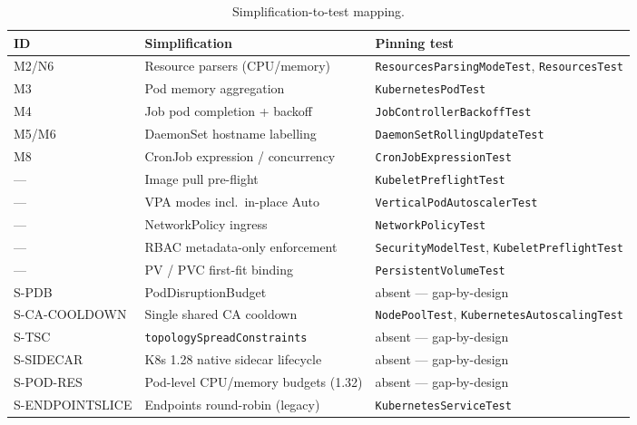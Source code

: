 \documentclass[ASNA,twocolumn]{USG}
\begin{document}
    \begin{table}[!t]
        \centering
        \caption{Simplification-to-test mapping.\label{tab:simpl-tests}}
        \footnotesize
        \setlength{\tabcolsep}{6pt}
        \begin{tabular*}{\textwidth}{@{\extracolsep{\fill}}lll@{}}
\toprule
\textbf{ID} & \textbf{Simplification} & \textbf{Pinning test} \\
\midrule
M2/N6           & Resource parsers (CPU/memory)         & \texttt{ResourcesParsingModeTest}, \texttt{ResourcesTest} \\
M3              & Pod memory aggregation                & \texttt{KubernetesPodTest} \\
M4              & Job pod completion + backoff          & \texttt{JobControllerBackoffTest} \\
M5/M6           & DaemonSet hostname labelling          & \texttt{DaemonSetRollingUpdateTest} \\
M8              & CronJob expression / concurrency      & \texttt{CronJobExpressionTest} \\
---             & Image pull pre-flight                 & \texttt{KubeletPreflightTest} \\
---             & VPA modes incl.\ in-place Auto        & \texttt{VerticalPodAutoscalerTest} \\
---             & NetworkPolicy ingress                 & \texttt{NetworkPolicyTest} \\
---             & RBAC metadata-only enforcement        & \texttt{SecurityModelTest}, \texttt{KubeletPreflightTest} \\
---             & PV / PVC first-fit binding            & \texttt{PersistentVolumeTest} \\
S-PDB           & PodDisruptionBudget                   & absent --- gap-by-design \\
S-CA-COOLDOWN   & Single shared CA cooldown             & \texttt{NodePoolTest}, \texttt{KubernetesAutoscalingTest} \\
S-TSC           & \texttt{topologySpreadConstraints}    & absent --- gap-by-design \\
S-SIDECAR       & K8s 1.28 native sidecar lifecycle     & absent --- gap-by-design \\
S-POD-RES       & Pod-level CPU/memory budgets (1.32)   & absent --- gap-by-design \\
S-ENDPOINTSLICE & Endpoints round-robin (legacy)        & \texttt{KubernetesServiceTest} \\

\end{tabular*}
\end{table}
\end{document}
